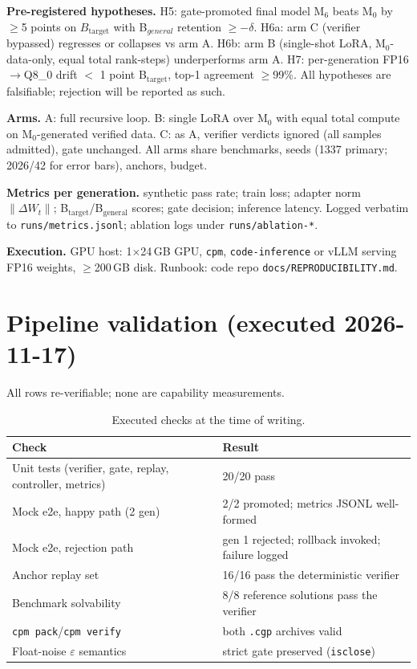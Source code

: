 \documentclass[11pt,a4paper]{article}
\begin{document}
\textbf{Pre-registered hypotheses.} H5: gate-promoted final model M$_6$ beats
M$_0$ by $\ge$5 points on $B_{\mathrm{target}}$ with B$_{general}$ retention
$\ge -\delta$. H6a: arm C (verifier bypassed) regresses or collapses vs arm A.
H6b: arm B (single-shot LoRA, M$_0$-data-only, equal total rank-steps)
underperforms arm A. H7: per-generation FP16$\rightarrow$Q8\_0 drift
$<$ 1 point B$_{\mathrm{target}}$, top-1 agreement $\ge$99\%. All hypotheses
are falsifiable; rejection will be reported as such.

\textbf{Arms.} A: full recursive loop. B: single LoRA over M$_0$ with equal
total compute on M$_0$-generated verified data. C: as A, verifier verdicts
ignored (all samples admitted), gate unchanged. All arms share benchmarks,
seeds (1337 primary; 2026/42 for error bars), anchors, budget.

\textbf{Metrics per generation.} synthetic pass rate; train loss; adapter
norm $\lVert\Delta W_t\rVert$; B$_{\mathrm{target}}$/B$_{\mathrm{general}}$
scores; gate decision; inference latency. Logged verbatim to
\texttt{runs/metrics.jsonl}; ablation logs under \texttt{runs/ablation-*}.

\textbf{Execution.} GPU host: 1$\times$24\,GB GPU, \texttt{cpm},
\texttt{code-inference} or vLLM serving FP16 weights, $\ge$200\,GB disk.
Runbook: code repo \texttt{docs/REPRODUCIBILITY.md}.

\section{Pipeline validation (executed 2026-11-17)}\label{sec:validation}

All rows re-verifiable; none are capability measurements.

\begin{table}[ht]
\centering
\small
\begin{tabular}{L{6.6cm} L{6.2cm}}
\toprule
\textbf{Check} & \textbf{Result} \\
\midrule
Unit tests (verifier, gate, replay, controller, metrics) & 20/20 pass \\
Mock e2e, happy path (2 gen) & 2/2 promoted; metrics JSONL well-formed \\
Mock e2e, rejection path & gen 1 rejected; rollback invoked; failure logged \\
Anchor replay set & 16/16 pass the deterministic verifier \\
Benchmark solvability & 8/8 reference solutions pass the verifier \\
\texttt{cpm pack}/\texttt{cpm verify} & both \texttt{.cgp} archives valid \\
Float-noise $\varepsilon$ semantics & strict gate preserved (\texttt{isclose}) \\
\bottomrule
\end{tabular}
\caption{Executed checks at the time of writing.}
\label{tab:measured}
\end{table}
\end{document}
